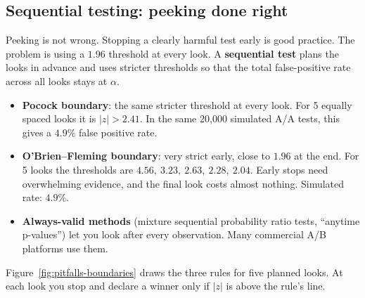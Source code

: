 \subsection{Sequential testing: peeking done right}

Peeking is not wrong. Stopping a clearly harmful test early is good
practice. The problem is using a $1.96$ threshold at every look. A
\textbf{sequential test} plans the looks in advance and uses stricter thresholds so
that the total false-positive rate across all looks stays at $\alpha$.

\begin{itemize}
\item \textbf{Pocock boundary}: the same stricter threshold at every look. For 5
  equally spaced looks it is $|z|>2.41$. In the same 20{,}000 simulated A/A tests,
  this gives a $4.9\%$ false positive rate.
\item \textbf{O'Brien--Fleming boundary}: very strict early, close to $1.96$ at the
  end. For 5 looks the thresholds are $4.56,\ 3.23,\ 2.63,\ 2.28,\ 2.04$. Early
  stops need overwhelming evidence, and the final look costs almost nothing.
  Simulated rate: $4.9\%$.
\item \textbf{Always-valid methods} (mixture sequential probability ratio tests,
  ``anytime p-values'') let you look after every observation. Many commercial A/B
  platforms use them.
\end{itemize}

Figure~\ref{fig:pitfalls-boundaries} draws the three rules for five planned looks.
At each look you stop and declare a winner only if $|z|$ is above the rule's line.

